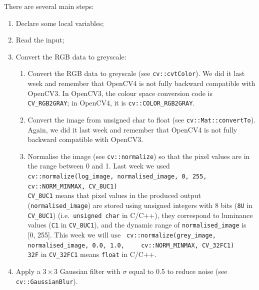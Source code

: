 \documentclass[english,a4paper,12pt,oneside]{article}
\begin{document}
There are several main steps:
\begin{enumerate}
	\item Declare some local variables;

	\item Read the input;

	\item Convert the RGB data to greyscale:

	\begin{enumerate}
		\item Convert the RGB data to greyscale (see \verb+cv::cvtColor+).
		We did it last week and remember that OpenCV4 is not fully backward compatible with OpenCV3. 
		In OpenCV3, the colour space conversion code is \verb+CV_RGB2GRAY+; in OpenCV4, it is \verb+cv::COLOR_RGB2GRAY+. 
		\item Convert the image from unsigned char to float (see \verb+cv::Mat::convertTo+). 
		Again, we did it last week and remember that OpenCV4 is not fully backward compatible with OpenCV3. 
		\item Normalise the image (see \verb+cv::normalize+) so that the pixel values are in the range between 0 and 1.
		Last week we used \verb+ cv::normalize(log_image, normalised_image, 0, 255,+ \verb+    cv::NORM_MINMAX, CV_8UC1)+ \\
		\verb+CV_8UC1+ means that pixel values in the produced output (\verb+normalised_image+) are stored using unsigned integers with 8 bits (\verb+8U+ in \verb+CV_8UC1+) (i.e.~\verb+unsigned char+ in C/C++), they correspond to luminance values (\verb+C1+ in \verb+CV_8UC1+), and the dynamic range of \verb+normalised_image+ is [0, 255]. 
		This week we will use \verb+ cv::normalize(grey_image, normalised_image, 0.0, 1.0,+ \verb+    cv::NORM_MINMAX, CV_32FC1)+\\ \verb+32F+ in \verb+CV_32FC1+ means \verb+float+ in C/C++.
	\end{enumerate}

	\item Apply a $3 \times 3$ Gaussian filter with $\sigma$ equal to 0.5 to reduce noise (see \verb+cv::GaussianBlur+).


\end{enumerate}
\end{document}
